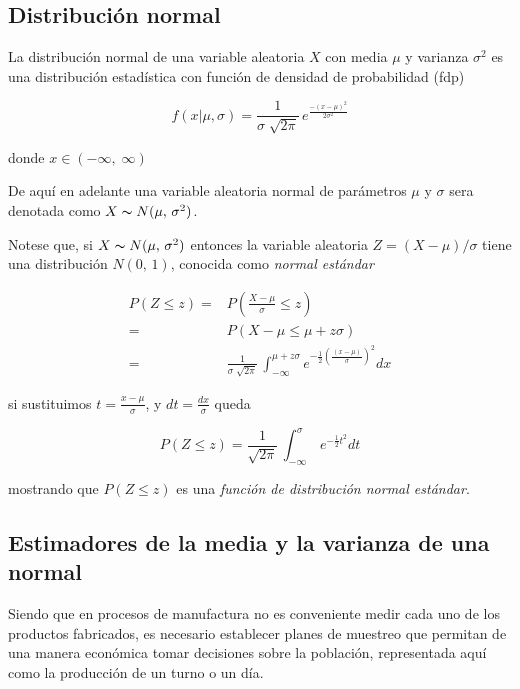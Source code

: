 \documentclass[english]{report}
\begin{document}
\subsection{Distribución normal}

La distribución normal de una variable aleatoria $X$ con media $\mu$
y varianza $\sigma^2$ es una distribución estadística
con función de densidad de probabilidad (fdp)

\begin{equation}
f(x|\mu,\sigma)=\frac{1}{\sigma\;\sqrt{2\pi}}\,e^{\frac{-(x-\mu)^{2}}{2\sigma^{2}}}
\label{c2eq1}
\end{equation}


donde $x\in(-\infty,\;\infty)$

De aquí en adelante una variable aleatoria normal de parámetros $\mu$
y $\sigma$ sera denotada como $X\thicksim N(\mu,\,\sigma^2)$.

Notese que, si $X\thicksim N(\mu,\,\sigma^2)$
entonces la variable aleatoria $Z=(X-\mu)/\sigma$ tiene una distribución
$N(0,\,1)$, conocida como \emph{normal estándar} 

\begin{align*}
P(Z\leq z)= & P(\frac{X-\mu}{\sigma}\leq z)\\
= & P(X-\mu\leq\mu+z\sigma)\\
= & \frac{1}{\sigma\;\sqrt{2\pi}}\,\int_{-\infty}^{\mu+z\sigma}e^{-\frac{1}{2}(\frac{(x-\mu)}{\sigma})^{2}}dx
\end{align*}

si sustituimos $t=\frac{x-\mu}{\sigma}$, y $dt=\frac{dx}{\sigma}$
queda

\begin{equation}
P(Z\leq z) = \frac{1}{\sqrt{2\pi}} \,\int_{-\infty}^{\sigma}\,e^{-\frac{1}{2}t^2}dt
\label{c2eq2}
\end{equation}

mostrando que $P(Z\leq z)$ es una \emph{función de distribución normal
estándar}. 


\subsection{Estimadores de la media y la varianza de una normal}

Siendo que en procesos de manufactura no es conveniente medir cada
uno de los productos fabricados, es necesario establecer planes de
muestreo que permitan de una manera económica tomar decisiones sobre
la población, representada aquí como la producción de un turno o un
día.
\end{document}
